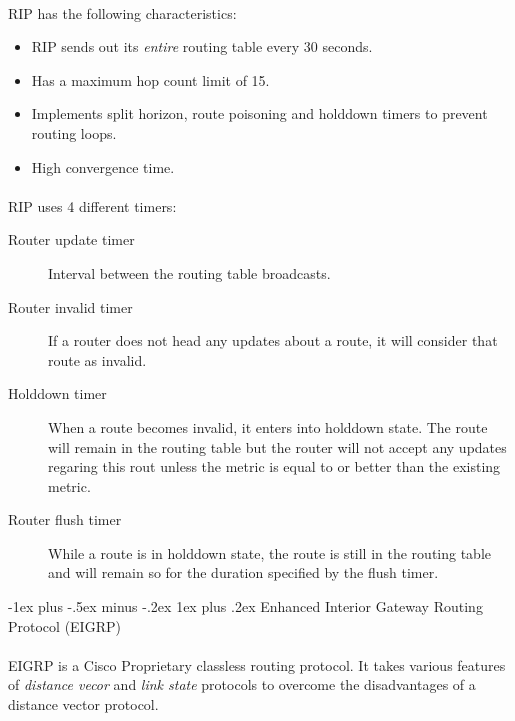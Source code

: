 \documentclass[10pt,landscape]{article}
\makeatletter
\renewcommand{\subsubsection}{\@startsection{subsubsection}{3}{0mm}%
                                {-1ex plus -.5ex minus -.2ex}%
                                {1ex plus .2ex}%
                                {\normalfont\small\bfseries}}
\makeatother
\begin{document}
\begin{multicols}{3}
\paragraph{}
RIP has the following characteristics:
\begin{itemize}
	\item RIP sends out its \textit{entire} routing table every 30 seconds.
	\item Has a maximum hop count limit of 15.
	\item Implements split horizon, route poisoning and holddown timers to prevent routing loops.
	\item High convergence time.
\end{itemize}
\paragraph{}
RIP uses 4 different timers:
\begin{description}
	\item[Router update timer] Interval between the routing table broadcasts.
	\item[Router invalid timer] If a router does not head any updates about a route, it will consider that route as invalid.
	\item[Holddown timer] When a route becomes invalid, it enters into holddown state. The route will remain in the routing table but the router will not accept any updates regaring this rout unless the metric is equal to or better than the existing metric.
	\item[Router flush timer] While a route is in holddown state, the route is still in the routing table and will remain so for the duration specified by the flush timer.
\end{description}

\subsubsection{Enhanced Interior Gateway Routing Protocol (EIGRP)}
\paragraph{}
EIGRP is a Cisco Proprietary classless routing protocol. It takes various features of \textit{distance vecor} and \textit{link state} protocols to overcome the disadvantages of a distance vector protocol.

\end{multicols}
\end{document}
